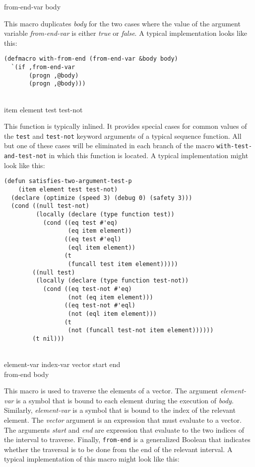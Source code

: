  {from-end-var \body body}

This macro duplicates \textit{body} for the two cases where the value
of the argument variable \textit{from-end-var} is either \emph{true}
or \emph{false}.  A typical implementation looks like this:

{\small\begin{verbatim}
(defmacro with-from-end (from-end-var &body body)
  `(if ,from-end-var
       (progn ,@body)
       (progn ,@body)))
\end{verbatim}}

\\
{item element test test-not}

This function is typically inlined.  It provides special cases for
common values of the \texttt{test} and \texttt{test-not} keyword
arguments of a typical sequence function.  All but one of these cases
will be eliminated in each branch of the macro
\texttt{with-test-and-test-not} in which this function is located.  A
typical implementation might look like this:

{\small\begin{verbatim}
(defun satisfies-two-argument-test-p
    (item element test test-not)
  (declare (optimize (speed 3) (debug 0) (safety 3)))
  (cond ((null test-not)
         (locally (declare (type function test))
           (cond ((eq test #'eq)
                  (eq item element))
                 ((eq test #'eql)
                  (eql item element))
                 (t
                  (funcall test item element)))))
        ((null test)
         (locally (declare (type function test-not))
           (cond ((eq test-not #'eq)
                  (not (eq item element)))
                 ((eq test-not #'eql)
                  (not (eql item element)))
                 (t
                  (not (funcall test-not item element))))))
        (t nil)))
\end{verbatim}}

\\
{element-var index-var vector start end\\
from-end \body body}

This macro is used to traverse the elements of a vector.  The argument
\textit{element-var} is a symbol that is bound to each element during
the execution of \textit{body}.  Similarly, \textit{element-var} is a
symbol that is bound to the index of the relevant element.  The
\textit{vector} argument is an expression that must evaluate to a
vector.  The arguments \textit{start} and \textit{end} are expression
that evaluate to the two indices of the interval to traverse.
Finally, \texttt{from-end} is a generalized Boolean that indicates
whether the traversal is to be done from the end of the relevant
interval.  A typical implementation of this macro might look like
this:

